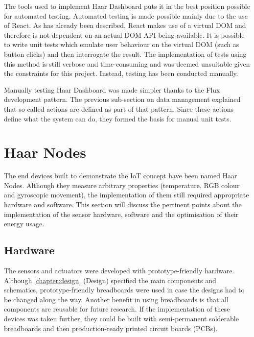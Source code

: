       The tools used to implement Haar Dashboard puts it in the best position possible for automated testing. Automated testing is made possible mainly due to the use of React. As has already been described, React makes use of a virtual DOM and therefore is not dependent on an actual DOM API being available. It is possible to write unit tests which emulate user behaviour on the virtual DOM (such as button clicks) and then interrogate the result. The implementation of tests using this method is still verbose and time-consuming and was deemed unsuitable given the constraints for this project. Instead, testing has been conducted manually.

      Manually testing Haar Dashboard was made simpler thanks to the Flux development pattern. The previous sub-section on data management explained that so-called actions are defined as part of that pattern. Since these actions define what the system can do, they formed the basis for manual unit tests.


  \section{Haar Nodes}
    The end devices built to demonstrate the IoT concept have been named Haar Nodes. Although they measure arbitrary properties (temperature, RGB colour and gyroscopic movement), the implementation of them still required appropriate hardware and software. This section will discuss the pertinent points about the implementation of the sensor hardware, software and the optimisation of their energy usage.

    \subsection{Hardware}
      The sensors and actuators were developed with prototype-friendly hardware. Although \ref{chapter:design} (Design) specified the main components and schematics, prototype-friendly breadboards were used in case the designs had to be changed along the way. Another benefit in using breadboards is that all components are reusable for future research. If the implementation of these devices was taken further, they could be built with semi-permanent solderable breadboards and then production-ready printed circuit boards (PCBs).

